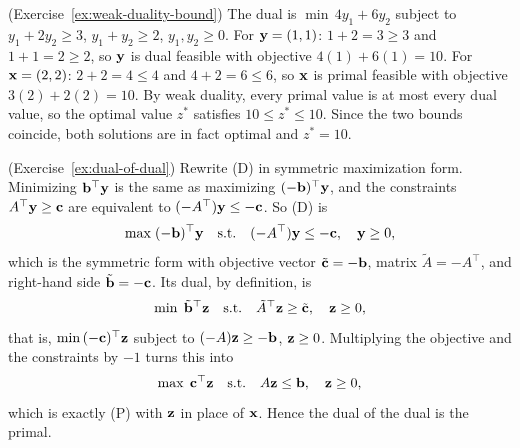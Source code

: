 \begin{solution}(Exercise~\ref{ex:weak-duality-bound})
The dual is $\min\, 4y_1 + 6y_2$ subject to $y_1 + 2y_2 \geq 3$, $y_1 + y_2 \geq 2$, $y_1, y_2 \geq 0$.
For $\mathbf{y} = (1,1)$: $1 + 2 = 3 \geq 3$ and $1 + 1 = 2 \geq 2$, so $\mathbf{y}$ is dual feasible with objective $4(1) + 6(1) = 10$.
For $\mathbf{x} = (2,2)$: $2 + 2 = 4 \leq 4$ and $4 + 2 = 6 \leq 6$, so $\mathbf{x}$ is primal feasible with objective $3(2) + 2(2) = 10$.
By weak duality, every primal value is at most every dual value, so the optimal value $z^*$ satisfies $10 \leq z^* \leq 10$.  Since the two bounds coincide, both solutions are in fact optimal and $z^* = 10$.
\end{solution}

\begin{solution}(Exercise~\ref{ex:dual-of-dual})
Rewrite (D) in symmetric maximization form.  Minimizing $\mathbf{b}^\top \mathbf{y}$ is the same as maximizing $(-\mathbf{b})^\top \mathbf{y}$, and the constraints $A^\top \mathbf{y} \geq \mathbf{c}$ are equivalent to $(-A^\top)\mathbf{y} \leq -\mathbf{c}$.  So (D) is
\[
\max \; (-\mathbf{b})^\top \mathbf{y} \quad \text{s.t.} \quad (-A^\top)\mathbf{y} \leq -\mathbf{c}, \quad \mathbf{y} \geq 0,
\]
which is the symmetric form with objective vector $\tilde{\mathbf{c}} = -\mathbf{b}$, matrix $\tilde{A} = -A^\top$, and right-hand side $\tilde{\mathbf{b}} = -\mathbf{c}$.  Its dual, by definition, is
\[
\min \; \tilde{\mathbf{b}}^\top \mathbf{z} \quad \text{s.t.} \quad \tilde{A}^\top \mathbf{z} \geq \tilde{\mathbf{c}}, \quad \mathbf{z} \geq 0,
\]
that is, $\min\, (-\mathbf{c})^\top \mathbf{z}$ subject to $(-A)\mathbf{z} \geq -\mathbf{b}$, $\mathbf{z} \geq 0$.  Multiplying the objective and the constraints by $-1$ turns this into
\[
\max \; \mathbf{c}^\top \mathbf{z} \quad \text{s.t.} \quad A\mathbf{z} \leq \mathbf{b}, \quad \mathbf{z} \geq 0,
\]
which is exactly (P) with $\mathbf{z}$ in place of $\mathbf{x}$.  Hence the dual of the dual is the primal.
\end{solution}

